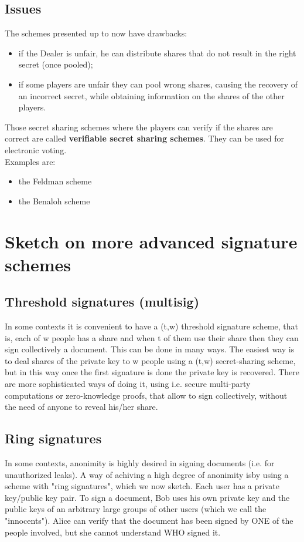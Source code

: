\documentclass[a4paper, 10pt, titlepage]{article}
\begin{document}
\subsection{Issues}
The schemes presented up to now have drawbacks:
\begin{itemize}
\item if the Dealer is unfair, he can distribute shares that do not result in the right secret (once pooled);
\item if some players are unfair they can pool wrong shares, causing the recovery of an incorrect secret, while obtaining information on the shares of the other players.
\end{itemize}
Those secret sharing schemes where the players can verify if the shares are correct are called \textbf{verifiable secret sharing schemes}. They can be used for electronic voting.\\
Examples are:
\begin{itemize}
\item the Feldman scheme
\item the Benaloh scheme
\end{itemize}

\newpage
\section{Sketch on more advanced signature schemes}
\subsection{Threshold signatures (multisig)}
In some contexts it is convenient to have a (t,w) threshold signature scheme, that is, each of w people has a share and when t of them use their share then they can sign collectively a document.
This can be done in many ways. The easiest way is to deal shares of the private key to w people using a (t,w) secret-sharing scheme, but in this way once the first signature is done the private key is recovered.
There are more sophisticated ways of doing it, using i.e. secure multi-party computations or zero-knowledge proofs, that allow to sign collectively, without the need of anyone to reveal his/her share.

\subsection{Ring signatures}
In some contexts, anonimity is highly desired in signing documents (i.e. for unauthorized leaks).
A way of achiving a high degree of anonimity isby using a scheme with "ring signatures", which we now sketch.
Each user has a private key/public key pair. To sign a document, Bob uses his own private key and the public keys of an arbitrary large groups of other users (which we call the "innocents"). Alice can verify that the document has been signed by ONE of the people involved, but she cannot understand WHO signed it.
\end{document}

